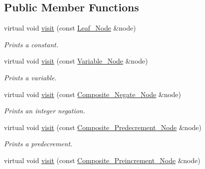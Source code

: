 \subsection*{Public Member Functions}
\begin{DoxyCompactItemize}
\item 
virtual void \hyperlink{classMadara_1_1Expression__Tree_1_1Print__Visitor_a95d7257c03bca39b8958720650c20a68}{visit} (const \hyperlink{classMadara_1_1Expression__Tree_1_1Leaf__Node}{Leaf\_\-Node} \&node)
\begin{DoxyCompactList}\small\item\em Prints a constant. \item\end{DoxyCompactList}\item 
virtual void \hyperlink{classMadara_1_1Expression__Tree_1_1Print__Visitor_a19b0a3b523c8e46d23338604cc272f2c}{visit} (const \hyperlink{classMadara_1_1Expression__Tree_1_1Variable__Node}{Variable\_\-Node} \&node)
\begin{DoxyCompactList}\small\item\em Prints a variable. \item\end{DoxyCompactList}\item 
virtual void \hyperlink{classMadara_1_1Expression__Tree_1_1Print__Visitor_a8bcad035d2a05437cc55c2a317935136}{visit} (const \hyperlink{classMadara_1_1Expression__Tree_1_1Composite__Negate__Node}{Composite\_\-Negate\_\-Node} \&node)
\begin{DoxyCompactList}\small\item\em Prints an integer negation. \item\end{DoxyCompactList}\item 
virtual void \hyperlink{classMadara_1_1Expression__Tree_1_1Print__Visitor_a248e48a1dff926b6e587ac247c0b269e}{visit} (const \hyperlink{classMadara_1_1Expression__Tree_1_1Composite__Predecrement__Node}{Composite\_\-Predecrement\_\-Node} \&node)
\begin{DoxyCompactList}\small\item\em Prints a predecrement. \item\end{DoxyCompactList}\item 
virtual void \hyperlink{classMadara_1_1Expression__Tree_1_1Print__Visitor_a56086ca594583631851a58da832b4200}{visit} (const \hyperlink{classMadara_1_1Expression__Tree_1_1Composite__Preincrement__Node}{Composite\_\-Preincrement\_\-Node} \&node)

\end{DoxyCompactItemize}
